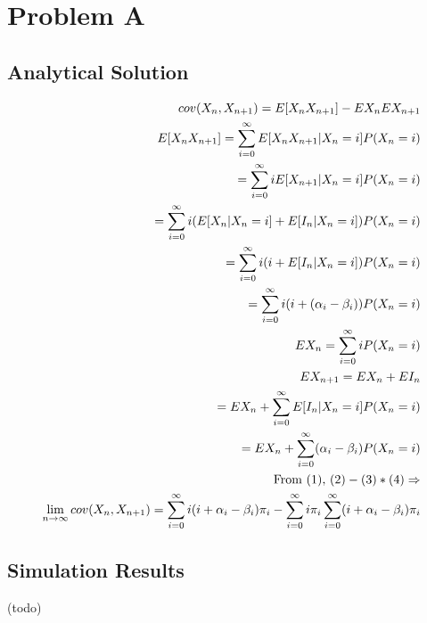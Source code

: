 \documentclass{article}
\begin{document}
\section{Problem A}
\subsection{Analytical Solution}
\begin{align}
cov(X_n,X_{n+1})=E[X_nX_{n+1}]-EX_nEX_{n+1} \\
E[X_nX_{n+1}]=\sum_{i=0}^{\infty}E[X_nX_{n+1}|X_n=i]P(X_n=i) \\
=\sum_{i=0}^{\infty}iE[X_{n+1}|X_n=i]P(X_n=i) \notag\\
=\sum_{i=0}^{\infty}i(E[X_n|X_n=i]+E[I_n|X_n=i])P(X_n=i) \notag\\
=\sum_{i=0}^{\infty}i(i+E[I_n|X_n=i])P(X_n=i) \notag\\
=\sum_{i=0}^{\infty}i(i+(\alpha_i-\beta_i))P(X_n=i) \notag\\
EX_n=\sum_{i=0}^{\infty}iP(X_n=i) \\
EX_{n+1}=EX_n+EI_n \\
=EX_n+\sum_{i=0}^{\infty}E[I_n|X_n=i]P(X_n=i) \notag\\
=EX_n+\sum_{i=0}^{\infty}(\alpha_i-\beta_i)P(X_n=i) \notag\\
\text{From (1), }(2)-(3)*(4)\Rightarrow \notag\\
\lim_{n\rightarrow\infty}cov(X_n,X_{n+1})=\sum_{i=0}^{\infty}i(i+\alpha_i-\beta_i)\pi_i-\sum_{i=0}^{\infty}i\pi_i\sum_{i=0}^{\infty}(i+\alpha_i-\beta_i)\pi_i
\end{align}
\subsection{Simulation Results}
(todo)
\end{document}
